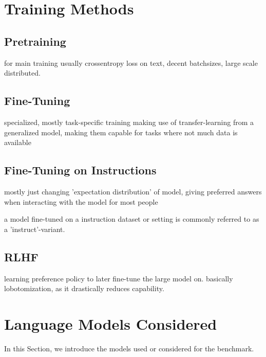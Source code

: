 \section{Training Methods}\label{sec:training}

\subsection{Pretraining}\label{sub:pretraining}
for main training usually crossentropy loss on text, decent batchsizes, large scale distributed.

\subsection{Fine-Tuning}\label{sub:finetune}
specialized, mostly task-specific training making use of transfer-learning from a generalized model, making them capable for tasks where not much data is available

\subsection{Fine-Tuning on Instructions}\label{sub:instruct}
mostly just changing 'expectation distribution' of model, giving preferred answers when interacting with the model for most people

a model fine-tuned on a instruction dataset or setting is commonly referred to as a 'instruct'-variant.

\subsection{RLHF}\label{sub:rlhf}
learning preference policy to later fine-tune the large model on. basically lobotomization, as it drastically reduces capability.

\section{Language Models Considered}\label{sec:models}
In this Section, we introduce the models used or considered for the benchmark.

